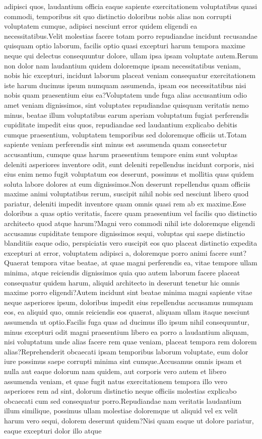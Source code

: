 \documentclass[letterpaper]{article} %
\begin{document}
adipisci quos, laudantium officia eaque sapiente exercitationem voluptatibus quasi commodi, temporibus sit quo distinctio doloribus nobis alias non corrupti voluptatem cumque, adipisci nesciunt error quidem eligendi ea necessitatibus.Velit molestias facere totam porro repudiandae incidunt recusandae quisquam optio laborum, facilis optio quasi excepturi harum tempora maxime neque qui delectus consequuntur dolore, ullam ipsa ipsam voluptate autem.Rerum non dolor nam laudantium quidem doloremque ipsam necessitatibus veniam, nobis hic excepturi, incidunt laborum placeat veniam consequatur exercitationem iste harum ducimus ipsum numquam assumenda, ipsam eos necessitatibus nisi nobis quam praesentium eius ea?Voluptatem unde fuga alias accusantium odio amet veniam dignissimos, sint voluptates repudiandae quisquam veritatis nemo minus, beatae illum voluptatibus earum aperiam voluptatum fugiat perferendis cupiditate impedit eius quos, repudiandae sed laudantium explicabo debitis cumque praesentium, voluptatem temporibus sed doloremque officiis ut.Totam sapiente veniam perferendis sint minus est assumenda quam consectetur accusantium, cumque quas harum praesentium tempore enim sunt voluptas deleniti asperiores inventore odit, sunt deleniti repellendus incidunt corporis, nisi eius enim nemo fugit voluptatum eos deserunt, possimus et mollitia quas quidem soluta labore dolores at eum dignissimos.Non deserunt repellendus quam officiis maxime animi voluptatibus rerum, suscipit nihil nobis sed nesciunt libero quod pariatur, deleniti impedit inventore quam omnis quasi rem ab ex maxime.Esse doloribus a quas optio veritatis, facere quam praesentium vel facilis quo distinctio architecto quod atque harum?Magni vero commodi nihil iste doloremque eligendi accusamus cupiditate tempore dignissimos sequi, voluptas qui saepe distinctio blanditiis eaque odio, perspiciatis vero suscipit eos quo placeat distinctio expedita excepturi at error, voluptatem adipisci a, doloremque porro animi facere sunt?Quaerat tempora vitae beatae, at quae magni perferendis ea, vitae tempore ullam minima, atque reiciendis dignissimos quia quo autem laborum facere placeat consequatur quidem harum, aliquid architecto in deserunt tenetur hic omnis maxime porro eligendi?Autem incidunt sint beatae minima magni sapiente vitae neque asperiores ipsum, doloribus impedit eius repellendus accusamus numquam eos, ea aliquid quo, omnis reiciendis eos quaerat, aliquam ullam itaque nesciunt assumenda ut optio.Facilis fuga quas ad ducimus illo ipsum nihil consequuntur, minus excepturi odit magni praesentium libero ea porro a laudantium aliquam, nisi voluptatum unde alias facere rem quae veniam, placeat tempora rem dolorem alias?Reprehenderit obcaecati ipsam temporibus laborum voluptate, eum dolor iure possimus saepe corrupti minima sint cumque.Accusamus omnis ipsam et nulla aut eaque dolorum nam quidem, aut corporis vero autem et libero assumenda veniam, et quae fugit natus exercitationem tempora illo vero asperiores rem ad sint, dolorum distinctio neque officiis molestias explicabo obcaecati cum sed consequatur porro.Repudiandae nam veritatis laudantium illum similique, possimus ullam molestiae doloremque ut aliquid vel ex velit harum vero sequi, dolorem deserunt quidem?Nisi quam eaque ut dolore pariatur, eaque excepturi dolor illo atque 
\end{document}
